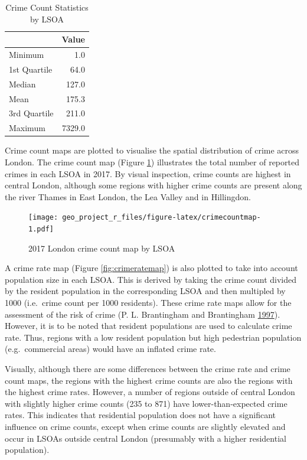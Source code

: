 \documentclass[]{article}
\theoremstyle{definition}
\theoremstyle{definition}
\theoremstyle{definition}
\theoremstyle{remark}
\begin{document}
\begin{table}

\caption{\label{tab:LSOAstats}Crime Count Statistics by LSOA}
\centering
\begin{tabular}[t]{l|r}
\hline
  & Value\\
\hline
Minimum & 1.0\\
\hline
1st Quartile & 64.0\\
\hline
Median & 127.0\\
\hline
Mean & 175.3\\
\hline
3rd Quartile & 211.0\\
\hline
Maximum & 7329.0\\
\hline
\end{tabular}
\end{table}

Crime count maps are plotted to visualise the spatial distribution of
crime across London. The crime count map (Figure
\ref{fig:crimecountmap}) illustrates the total number of reported crimes
in each LSOA in 2017. By visual inspection, crime counts are highest in
central London, although some regions with higher crime counts are
present along the river Thames in East London, the Lea Valley and in
Hillingdon.

\begin{figure}
\centering
\texttt{[image: geo\_project\_r\_files/figure-latex/crimecountmap-1.pdf]}
\caption{\label{fig:crimecountmap}2017 London crime count map by LSOA}
\end{figure}

A crime rate map (Figure \ref{fig:crimeratemap}) is also plotted to take
into account population size in each LSOA. This is derived by taking the
crime count divided by the resident population in the corresponding LSOA
and then multipled by 1000 (i.e.~crime count per 1000 residents). These
crime rate maps allow for the assessment of the risk of crime (P. L.
Brantingham and Brantingham
\protect\hyperlink{ref-Brantingham1997}{1997}). However, it is to be
noted that resident populations are used to calculate crime rate. Thus,
regions with a low resident population but high pedestrian population
(e.g.~commercial areas) would have an inflated crime rate.

Visually, although there are some differences between the crime rate and
crime count maps, the regions with the highest crime counts are also the
regions with the highest crime rates. However, a number of regions
outside of central London with slightly higher crime counts (235 to 871)
have lower-than-expected crime rates. This indicates that residential
population does not have a significant influence on crime counts, except
when crime counts are slightly elevated and occur in LSOAs outside
central London (presumably with a higher residential population).
\end{document}
